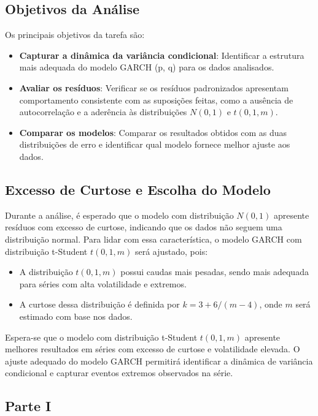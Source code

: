\documentclass[a4paper, 12pt]{article}
\begin{document}
\subsection{Objetivos da Análise}
Os principais objetivos da tarefa são:
\begin{itemize}
    \item \textbf{Capturar a dinâmica da variância condicional}: Identificar a estrutura mais adequada do modelo GARCH (p, q) para os dados analisados.
    \item \textbf{Avaliar os resíduos}: Verificar se os resíduos padronizados apresentam comportamento consistente com as suposições feitas, como a ausência de autocorrelação e a aderência às distribuições \(N(0,1)\) e \(t(0,1,m)\).
    \item \textbf{Comparar os modelos}: Comparar os resultados obtidos com as duas distribuições de erro e identificar qual modelo fornece melhor ajuste aos dados.
\end{itemize}

\subsection{Excesso de Curtose e Escolha do Modelo}
Durante a análise, é esperado que o modelo com distribuição \(N(0,1)\) apresente resíduos com excesso de curtose, indicando que os dados não seguem uma distribuição normal. Para lidar com essa característica, o modelo GARCH com distribuição t-Student \(t(0,1,m)\) será ajustado, pois:
\begin{itemize}
    \item A distribuição \(t(0,1,m)\) possui caudas mais pesadas, sendo mais adequada para séries com alta volatilidade e extremos.
    \item A curtose dessa distribuição é definida por \(k = 3 + 6/(m-4)\), onde \(m\) será estimado com base nos dados.
\end{itemize}

 Espera-se que o modelo com distribuição t-Student \(t(0,1,m)\) apresente melhores resultados em séries com excesso de curtose e volatilidade elevada.
O ajuste adequado do modelo GARCH permitirá identificar a dinâmica de variância condicional e capturar eventos extremos observados na série.



\subsection{Parte I}\label{subsec:tarefa2_pt1}
\end{document}
